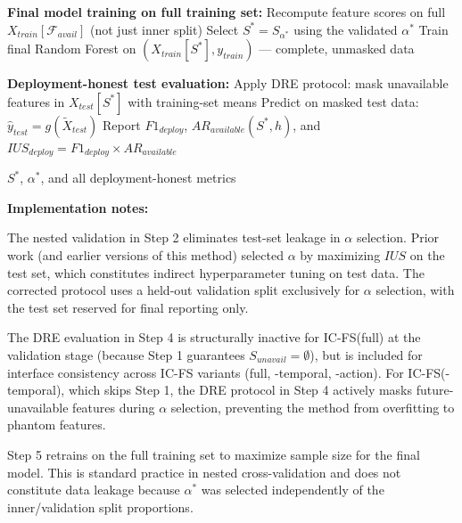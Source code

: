 \documentclass[a4paper,fleqn]{cas-sc}
\begin{document}
\begin{algorithm}
\begin{algorithmic}[1]
    \State \textbf{Final model training on full training set:}
    \Statex \hspace{\algorithmicindent} Recompute feature scores on full $X_{train}[\mathcal{F}_{avail}]$ (not just inner split)
    \Statex \hspace{\algorithmicindent} Select $S^* = S_{\alpha^*}$ using the validated $\alpha^*$
    \Statex \hspace{\algorithmicindent} Train final Random Forest on $(X_{train}[S^*], y_{train})$ --- complete, unmasked data

    \State \textbf{Deployment-honest test evaluation:}
    \Statex \hspace{\algorithmicindent} Apply DRE protocol: mask unavailable features in $X_{test}[S^*]$ with training-set means
    \Statex \hspace{\algorithmicindent} Predict on masked test data: $\hat{y}_{test} = g(\tilde{X}_{test})$
    \Statex \hspace{\algorithmicindent} Report $F1_{deploy}$, $AR_{available}(S^*, h)$, and $IUS_{deploy} = F1_{deploy} \times AR_{available}$

    \State \Return $S^*$, $\alpha^*$, and all deployment-honest metrics
\end{algorithmic}
\end{algorithm}

\textbf{Implementation notes:}

The nested validation in Step 2 eliminates test-set leakage in $\alpha$ selection. Prior work (and earlier versions of this method) selected $\alpha$ by maximizing $IUS$ on the test set, which constitutes indirect hyperparameter tuning on test data. The corrected protocol uses a held-out validation split exclusively for $\alpha$ selection, with the test set reserved for final reporting only.

The DRE evaluation in Step 4 is structurally inactive for IC-FS(full) at the validation stage (because Step 1 guarantees $S_{unavail} = \emptyset$), but is included for interface consistency across IC-FS variants (full, -temporal, -action). For IC-FS(-temporal), which skips Step 1, the DRE protocol in Step 4 actively masks future-unavailable features during $\alpha$ selection, preventing the method from overfitting to phantom features.

Step 5 retrains on the full training set to maximize sample size for the final model. This is standard practice in nested cross-validation and does not constitute data leakage because $\alpha^*$ was selected independently of the inner/validation split proportions.
\end{document}
